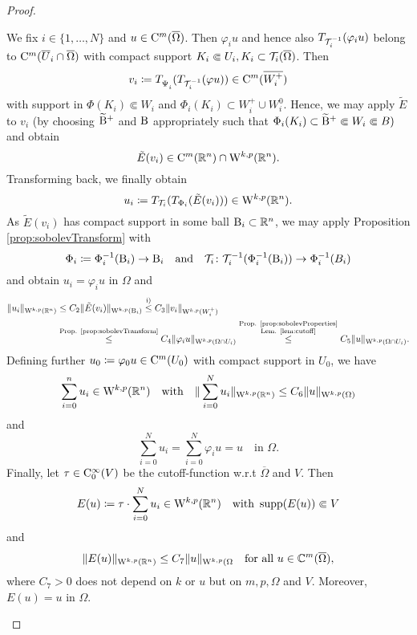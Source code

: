 \begin{proof}
\begin{enumerate}[i)]
      We fix $i \in \{1,\dots,N\}$ and $u \in \mathrm{C}^m(\overline\Omega)$.
      Then $\varphi_i u$ and hence also $T_{\mathcal{T}_i^{-1}}(\varphi_i u)$ belong to $\mathrm{C}^m(\overline U_i \cap \overline\Omega)$ with compact support $K_i \Subset U_i, K_i \subset \mathcal{T}_i(\overline\Omega)$.
      Then
      $$
      v_i \coloneqq T_{\vphantom{\Tau_i^{-1}}{\Psi_i^{\vphantom{-1}}}}(T_{\Tau_i^{-1}}(\varphi u)) \in \CC^m(\overline{W_i^+})
      $$
      with support in $\Phi(K_i) \Subset W_i$ and $\Phi_i(K_i) \subset W_i^+ \cup W_i^0$.
      Hence, we may apply $\tilde E$ to $v_i$ (by choosing $\widetilde {\mathrm{B}}^+$ and $\mathrm{B}$ appropriately such that $\Phi_i(K_i) \subset \widetilde {\mathrm{B}}^+ \Subset W_i \Subset B)$ and obtain
      $$
      \tilde E(v_i)  \in \mathrm{C}^m(\mathbb{R}^n) \cap \mathrm{W}^{k,p}(\mathbb{R}^n).
      $$
      Transforming back, we finally obtain
      $$
      u_i \coloneqq T_{\mathcal{T}_i} ( T_{\Phi_i}( \tilde E(v_i))) \in \mathrm{W}^{k,p}(\mathbb{R}^n).
      $$
      As $\tilde E(v_i)$ has compact support in some ball $\mathrm{B}_i \subset \mathbb{R}^n$, we may apply Proposition \ref{prop:sobolevTransform} with 
      $$
      \Phi_i \coloneqq \Phi_i^{-1}(\mathrm{B}_i) \to \mathrm{B}_i \quad\text{and}\quad
      \mathcal{T}_i \colon \mathcal{T}_i^{-1}(\Phi_i^{-1}(\mathrm{B}_i)) \to \Phi_i^{-1}(B_i)
      $$
      and obtain $u_i = \varphi_i u$ in $\Omega$ and 
      \begin{align*}
        \|u_i\|_{\mathrm{W}^{k,p}(\mathbb{R}^n)}
        &\leq C_2 \| \tilde E(v_i) \|_{\mathrm{W}^{k,p}(\mathrm{B}_i)}
        \overset{\mathrm i)}{\leq} C_3 \| v_i \|_{\mathrm{W}^{k,p}(W_i^+)} \\
        &\overset{\text{Prop. \ref{prop:sobolevTransform}}}{\leq} C_4 \|\varphi_i u\|_{\mathrm{W}^{k,p}(\Omega \cap U_i)}  
        \overset{\substack{\text{Prop. \ref{prop:sobolevProperties}} \\ \text{Lem. \ref{lem:cutoff}}}}{\leq} C_5 \|u\|_{\mathrm{W}^{k,p}(\Omega \cap U_i)}.
      \end{align*}
      Defining further $u_0 \coloneqq \varphi_0 u \in \mathrm{C}^m(U_0)$ with compact support in $U_0$, we have 
      $$
        \sum_{i = 0}^n u_i \in \mathrm{W}^{k,p}(\mathbb{R}^n) \quad\text{with}\quad \| \sum_{i = 0}^N u_i \|_{\mathrm{W}^{k,p}(\mathbb{R}^n)} \leq C_6 \|u\|_{\mathrm{W}^{k,p}(\Omega)} 
        $$
        and
        $$
        \sum_{i = 0}^N u_i = \sum_{i = 0}^N \varphi_i u = u \quad\text{in }\Omega.
        $$
        Finally, let $\tau \in \mathrm{C}_0^\infty(V)$ be the cutoff-function w.r.t $\overline \Omega$ and $V$. Then
        $$
        E(u) \coloneqq \tau \cdot \sum_{i = 0}^N u_i \in \mathrm{W}^{k,p}(\mathbb{R}^n) \quad\text{with } \operatorname{supp} (E(u)) \Subset V
        $$
        and
        \begin{equation}
          \label{eq:continuousExtension}
          \|E(u)\|_{\mathrm{W}^{k,p}(\mathbb{R}^n)} \leq C_7 \|u \|_{\mathrm{W}^{k,p}(\Omega} \quad\text{for all } u \in \mathbb{C}^m(\overline\Omega),
        \end{equation}
        where $C_7 > 0$ does not depend on $k$ or $u$ but on $m,p,\Omega$ and $V$.
        Moreover, $E(u) = u$ in $\Omega$.


\end{enumerate}
\end{proof}
